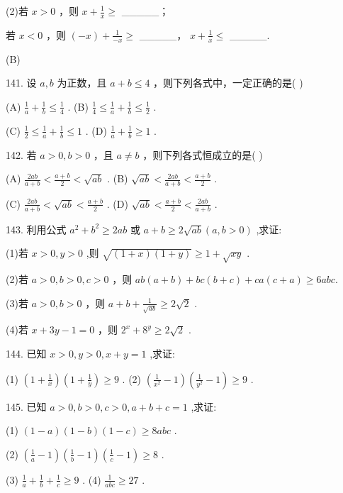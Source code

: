 \documentclass[10pt]{article}
\begin{document}
(2)若 \(x > 0\) ，则 \(x + \frac{1}{x} \geq\) \_\_\_\_\_；

若 \(x < 0\) ，则 \(\left( {-x}\right)  + \frac{1}{-x} \geq\) \_\_\_\_\_， \(x + \frac{1}{x} \leq\) \_\_\_\_\_.

(B)

141. 设 \(a,b\) 为正数，且 \(a + b \leq  4\) ，则下列各式中，一定正确的是( )

(A) \(\frac{1}{a} + \frac{1}{b} \leq  \frac{1}{4}\) . (B) \(\frac{1}{4} \leq  \frac{1}{a} + \frac{1}{b} \leq  \frac{1}{2}\) .

(C) \(\frac{1}{2} \leq  \frac{1}{a} + \frac{1}{b} \leq  1\) . (D) \(\frac{1}{a} + \frac{1}{b} \geq  1\) .

142. 若 \(a > 0,b > 0\) ，且 \(a \neq  b\) ，则下列各式恒成立的是( )

(A) \(\frac{2ab}{a + b} < \frac{a + b}{2} < \sqrt{ab}\) . (B) \(\sqrt{ab} < \frac{2ab}{a + b} < \frac{a + b}{2}\) .

(C) \(\frac{2ab}{a + b} < \sqrt{ab} < \frac{a + b}{2}\) . (D) \(\sqrt{ab} < \frac{a + b}{2} < \frac{2ab}{a + b}\) .

143. 利用公式 \({a}^{2} + {b}^{2} \geq  {2ab}\) 或 \(a + b \geq  2\sqrt{ab}\left( {a,b > 0}\right)\) ,求证:

(1)若 \(x > 0,y > 0\) ,则 \(\sqrt{\left( {1 + x}\right) \left( {1 + y}\right) } \geq  1 + \sqrt{xy}\) .

(2)若 \(a > 0,b > 0,c > 0\) ，则 \({ab}\left( {a + b}\right)  + {bc}\left( {b + c}\right)  + {ca}\left( {c + a}\right)  \geq  {6abc}.\)

(3)若 \(a > 0,b > 0\) ，则 \(a + b + \frac{1}{\sqrt{ab}} \geq  2\sqrt{2}\) .

(4)若 \(x + {3y} - 1 = 0\) ，则 \({2}^{x} + {8}^{y} \geq  2\sqrt{2}\) .

144. 已知 \(x > 0,y > 0,x + y = 1\) ,求证:

(1) \(\left( {1 + \frac{1}{x}}\right) \left( {1 + \frac{1}{y}}\right)  \geq  9\) . (2) \(\left( {\frac{1}{{x}^{2}} - 1}\right) \left( {\frac{1}{{y}^{2}} - 1}\right)  \geq  9\) .

145. 已知 \(a > 0,b > 0,c > 0,a + b + c = 1\) ,求证:

(1) \(\left( {1 - a}\right) \left( {1 - b}\right) \left( {1 - c}\right)  \geq  {8abc}\) .

(2) \(\left( {\frac{1}{a} - 1}\right) \left( {\frac{1}{b} - 1}\right) \left( {\frac{1}{c} - 1}\right)  \geq  8\) .

(3) \(\frac{1}{a} + \frac{1}{b} + \frac{1}{c} \geq  9\) . (4) \(\frac{1}{abc} \geq  {27}\) .
\end{document}
